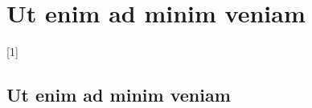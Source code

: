 \chapter{Ut enim ad minim veniam}
\setcounter{page}{1}

\begin{chapterabstract}
	\lipsum[1]
\end{chapterabstract}

\lipsum[2][1-4]{} [1]

\lipsum[4]

\section{Ut enim ad minim veniam}

\lipsum[6-7]

